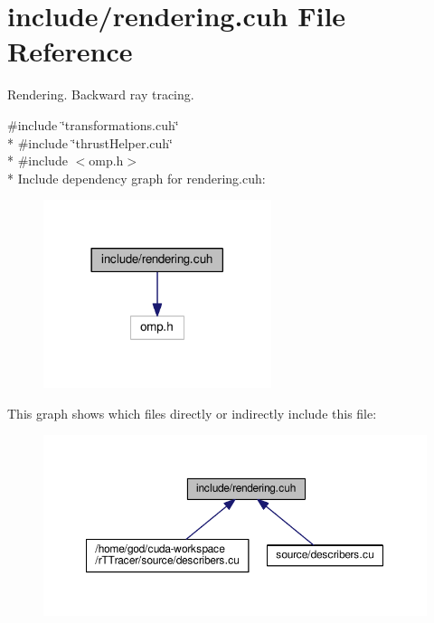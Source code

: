 \hypertarget{cuda_tracer__0__1_2include_2rendering_8cuh}{}\section{include/rendering.cuh File Reference}
\label{cuda_tracer__0__1_2include_2rendering_8cuh}


Rendering. Backward ray tracing.  


{\ttfamily \#include \char`\"{}transformations.\+cuh\char`\"{}}\\*
{\ttfamily \#include \char`\"{}thrust\+Helper.\+cuh\char`\"{}}\\*
{\ttfamily \#include $<$omp.\+h$>$}\\*
Include dependency graph for rendering.\+cuh\+:
\nopagebreak
\begin{figure}[H]
\begin{center}
\leavevmode
\includegraphics[width=189pt]{cuda_tracer__0__1_2include_2rendering_8cuh__incl}
\end{center}
\end{figure}
This graph shows which files directly or indirectly include this file\+:
\nopagebreak
\begin{figure}[H]
\begin{center}
\leavevmode
\includegraphics[width=350pt]{cuda_tracer__0__1_2include_2rendering_8cuh__dep__incl}
\end{center}
\end{figure}
